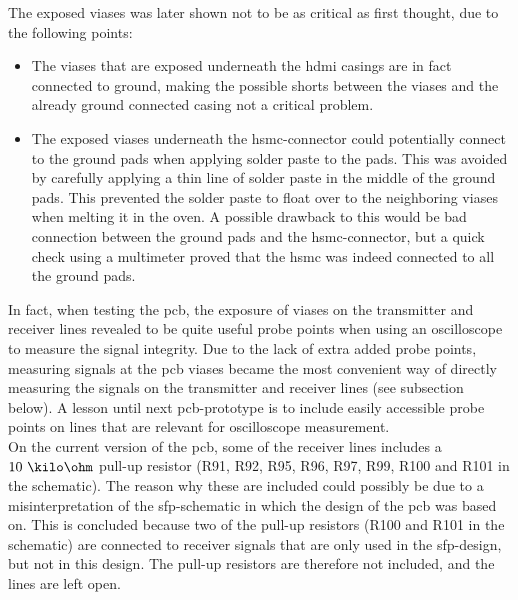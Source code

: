 \documentclass[main.tex]{subfiles}
\begin{document}
The exposed viases was later shown not to be as critical as first thought, due to the following points: \\
\begin{itemize}

\item The viases that are exposed underneath the \gls{hdmi} casings are in fact connected to ground, making the possible shorts between the viases and the already ground connected casing not a critical problem. \\

\item The exposed viases underneath the \gls{hsmc}-connector could potentially connect to the ground pads when applying solder paste to the pads. This was avoided by carefully applying  a thin line of solder paste in the middle of the ground pads. This prevented the solder paste to float over to the neighboring viases when melting it in the oven. A possible drawback to this would be bad connection between the ground pads and the \gls{hsmc}-connector, but a quick check using a multimeter proved that the \gls{hsmc} was indeed connected to all the ground pads.\\
\end{itemize}

In fact, when testing the \gls{pcb}, the exposure of viases on the transmitter and receiver lines revealed to be quite useful probe points when using an oscilloscope to measure the signal integrity. Due to the lack of extra added probe points, measuring signals at the \gls{pcb} viases became the most convenient way of directly measuring the signals on the transmitter and receiver lines (see subsection below). A lesson until next \gls{pcb}-prototype is to include easily accessible probe points on lines that are relevant for oscilloscope measurement.\\

On the current version of the \gls{pcb}, some of the receiver lines includes a $10~\kilo\ohm$ pull-up resistor (R91, R92, R95, R96, R97, R99, R100 and R101 in the schematic). The reason why these are included could possibly be due to a misinterpretation of the \gls{sfp}-schematic in which the design of the \gls{pcb} was based on. This is concluded because two of the pull-up resistors (R100 and R101 in the schematic) are connected to receiver signals that are only used in the \gls{sfp}-design, but not in this design. The pull-up resistors are therefore not included, and the lines are left open.
\end{document}
